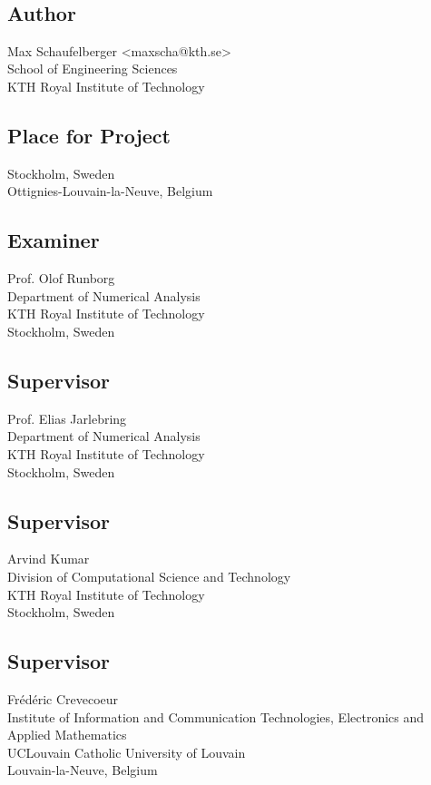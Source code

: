 \newpage
\thispagestyle{plain}
~\\
\vfill
{ 
	\subsection*{Author}
	Max Schaufelberger <maxscha@kth.se>\\
	School of Engineering Sciences\\
	KTH Royal Institute of Technology

	\subsection*{Place for Project}
	Stockholm, Sweden\\
	Ottignies-Louvain-la-Neuve, Belgium

	\subsection*{Examiner}
	Prof. Olof Runborg\\
	Department of Numerical Analysis \\
	KTH Royal Institute of Technology\\
	Stockholm, Sweden

	\subsection*{Supervisor }
	Prof. Elias Jarlebring\\
	Department of Numerical Analysis\\
	KTH Royal Institute of Technology\\
	Stockholm, Sweden
	~
	\subsection*{Supervisor }
	Arvind Kumar\\
	Division of Computational Science and Technology\\
	KTH Royal Institute of Technology\\
	Stockholm, Sweden
	~
	\subsection*{Supervisor }
	Frédéric Crevecoeur\\
	Institute of Information and Communication Technologies, Electronics and Applied Mathematics\\
	UCLouvain Catholic University of Louvain\\
	Louvain-la-Neuve, Belgium
	~


}


